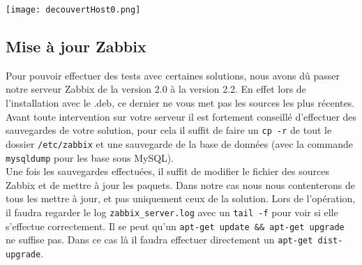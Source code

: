 			\begin{center}
				\texttt{[image: decouvertHost0.png]}
			\end{center}

	\subsection{Mise à jour Zabbix}
		\vspace{0.3cm}

		Pour pouvoir effectuer des tests avec certaines solutions, nous avons dû passer notre serveur Zabbix de la version 2.0 à la version 2.2. En effet lors de l'installation avec le .deb, ce dernier ne vous met pas les sources les plus récentes. Avant toute intervention sur votre serveur il est fortement conseillé d'effectuer des sauvegardes de votre solution, pour cela il suffit de faire un \verb?cp -r? de tout le dossier \verb?/etc/zabbix? et une sauvegarde de la base de données (avec la commande \verb?mysqldump? pour les base sous MySQL).\\

		Une fois les sauvegardes effectuées, il suffit de modifier le fichier des sources Zabbix et de mettre à jour les paquets. Dans notre cas nous nous contenterons de tous les mettre à jour, et pas uniquement ceux de la solution. Lors de l'opération, il faudra regarder le log \verb?zabbix_server.log? avec un \verb?tail -f? pour voir si elle s'effectue correctement. Il se peut qu'un \verb?apt-get update && apt-get upgrade? ne suffise pas. Dans ce cas là il faudra effectuer directement un \verb?apt-get dist-upgrade?.

			\\

